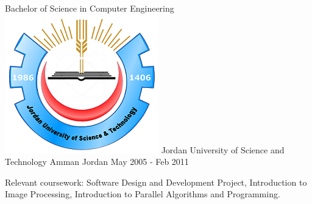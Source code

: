 \begin{cventries}
{\begin{cvitems}
      \end{cvitems}
    }
    \vspace{-2mm} \cventry
    {Bachelor of Science in Computer Engineering}
    {\includegraphics[scale=0.08]{img/Hi-Logo.png} Jordan University of Science and Technology}
    {Amman Jordan}
    {May 2005 - Feb 2011}
    {
      \begin{cvitems}     
        \item {Relevant coursework: Software Design and Development Project, Introduction to Image Processing, Introduction to Parallel Algorithms and Programming.}     
      \end{cvitems}
    }
\end{cventries}
